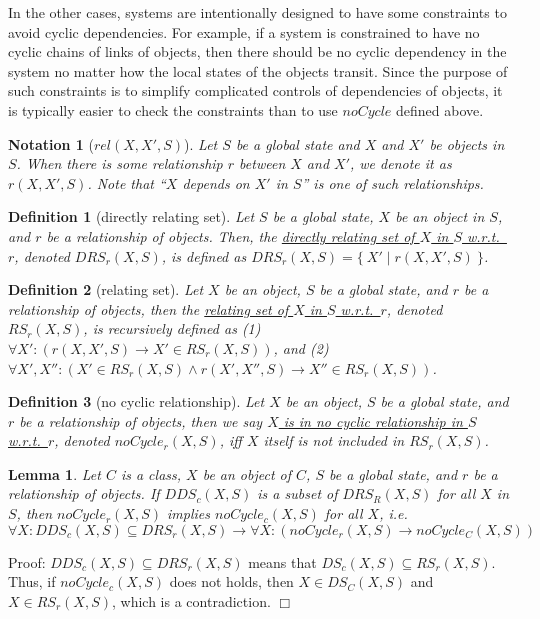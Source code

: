 \documentclass[12pt]{report}
\newtheorem{lemma}{Lemma}
\newtheorem{notation}{Notation}
\newtheorem{definition}{Definition}
\newcommand{\ra}{\rightarrow}
\newcommand{\ul}{\underline}
\begin{document}
In the other cases, systems are intentionally designed to have some constraints
to avoid cyclic dependencies. For example, if a system is constrained to
have no cyclic chains of links of objects, then there should be no
cyclic dependency in the system no matter how the local states of the
objects transit. Since the purpose of such constraints is to simplify
complicated controls of dependencies of objects, it is typically easier
to check the constraints than to use $noCycle$ defined above.

\begin{notation}[$rel(X,X',S)$]
  Let $S$ be a global state and $X$ and $X'$ be objects in $S$.  When
  there is some relationship $r$ between $X$ and $X'$, we denote it
  as \ul{$r(X,X',S)$}. Note that ``$X$ depends on $X'$ in $S$'' is one
  of such relationships.
\end{notation}

\begin{definition}[directly relating set]
Let $S$ be a global state, $X$ be an object in $S$, and $r$ be a
relationship of objects. Then, the \ul{directly relating set of $X$ in
  $S$ w.r.t.\ $r$}, denoted \ul{$DRS_r(X,S)$}, is defined as
$DRS_r(X,S)=\{~X'\mid r(X,X',S)~\}$.
\end{definition}

\begin{definition}[relating set]
Let $X$ be an object, $S$ be a global state, and $r$ be a relationship
of objects, then the \ul{relating set of $X$ in $S$
  w.r.t.\ $r$}, denoted \ul{$RS_r(X,S)$}, is recursively defined
as (1) $\forall X': (r(X,X',S) \ra X'\in RS_r(X,S))$, and (2)
$\forall X',X'': (X'\in RS_r(X,S) \land r(X',X'',S) \ra X''\in
RS_r(X,S))$.
\end{definition}

\begin{definition}[no cyclic relationship]
Let $X$ be an object, $S$ be a global state, and $r$ be a relationship
of objects, then we say \ul{$X$ is in no cyclic relationship in $S$
  w.r.t.\ $r$}, denoted \ul{$noCycle_r(X,S)$}, iff $X$ itself is not
included in $RS_r(X,S)$.
\end{definition}

\begin{lemma}
Let $C$ is a class, $X$ be an object of $C$, $S$ be a global state,
and $r$ be a relationship of objects. If $DDS_c(X,S)$ is a subset of
$DRS_R(X,S)$ for all $X$ in $S$, then $noCycle_r(X,S)$ implies
$noCycle_c(X,S)$ for all $X$, i.e.
\[\forall X:DDS_c(X,S)\subseteq DRS_r(X,S) \ra \forall X: (noCycle_r(X,S) \ra
noCycle_C(X,S))\]
\end{lemma}
Proof: $DDS_c(X,S)\subseteq DRS_r(X,S)$ means that $DS_c(X,S)\subseteq
RS_r(X,S)$.  Thus, if $noCycle_c(X,S)$ does not holds, then $X\in
DS_C(X,S)$ and $X\in RS_r(X,S)$, which is a contradiction. $\Box$\\
\end{document}
